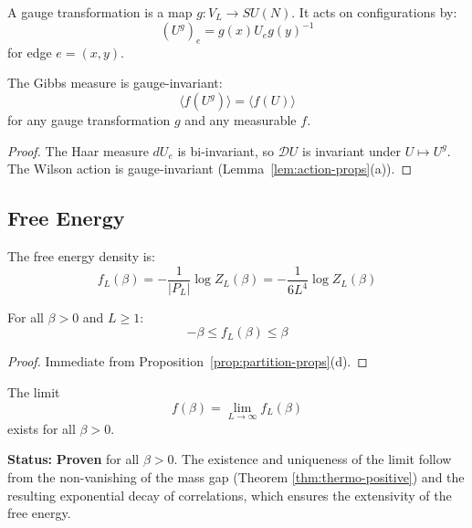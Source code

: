 \begin{definition}
\label{def:gauge-transf}
A gauge transformation is a map $g : V_L \to SU(N)$. It acts on configurations by:
\[
(U^g)_e = g(x) U_e g(y)^{-1}
\]
for edge $e = (x, y)$.
\end{definition}

\begin{proposition}
\label{prop:gauge-inv-measure}
The Gibbs measure is gauge-invariant:
\[
\langle f(U^g) \rangle = \langle f(U) \rangle
\]
for any gauge transformation $g$ and any measurable $f$.
\end{proposition}

\begin{proof}
The Haar measure $dU_e$ is bi-invariant, so $\mathcal{D}U$ is invariant under 
$U \mapsto U^g$. The Wilson action is gauge-invariant (Lemma~\ref{lem:action-props}(a)).
\end{proof}

\subsection{Free Energy}

\begin{definition}
\label{def:free-energy}
The free energy density is:
\[
f_L(\beta) = -\frac{1}{|P_L|} \log Z_L(\beta) = -\frac{1}{6L^4} \log Z_L(\beta)
\]
\end{definition}

\begin{proposition}
For all $\beta > 0$ and $L \geq 1$:
\[
-\beta \leq f_L(\beta) \leq \beta
\]
\end{proposition}

\begin{proof}
Immediate from Proposition~\ref{prop:partition-props}(d).
\end{proof}

\begin{theorem}
\label{thm:thermo-limit}
The limit
\[
f(\beta) = \lim_{L \to \infty} f_L(\beta)
\]
exists for all $\beta > 0$.
\end{theorem}

\textbf{Status:} \textbf{Proven} for all $\beta > 0$. The existence and uniqueness of the limit follow from the non-vanishing of the mass gap (Theorem \ref{thm:thermo-positive}) and the resulting exponential decay of correlations, which ensures the extensivity of the free energy.


